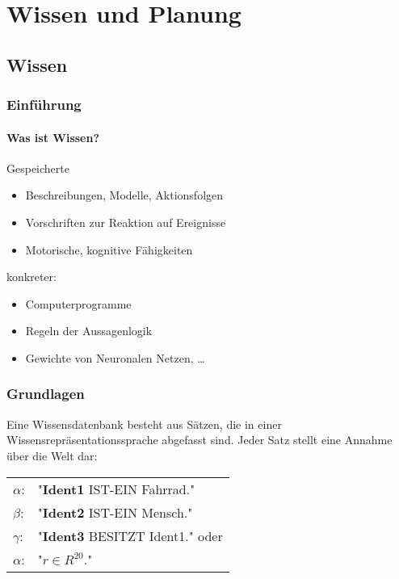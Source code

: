 
\chapter{Wissen und Planung}
\section{Wissen}
\subsection{Einführung}

\subsubsection*{Was ist Wissen?}
Gespeicherte
\begin{itemize}
\item Beschreibungen, Modelle, Aktionsfolgen
\item Vorschriften zur Reaktion auf Ereignisse
\item Motorische, kognitive Fähigkeiten
\end{itemize}
konkreter:
\begin{itemize}
\item Computerprogramme
\item Regeln der Aussagenlogik
\item Gewichte von Neuronalen Netzen, \dots
\end{itemize}

\subsection{Grundlagen}


Eine Wissensdatenbank besteht aus Sätzen, die in einer Wissensrepräsentationssprache abgefasst sind. Jeder Satz stellt eine Annahme über die Welt dar:
\begin{center}
\begin{tabular}{ll}
$\alpha$: & "{}\textbf{Ident1} IST-EIN Fahrrad."{} \\ $\beta$: & "{}\textbf{Ident2} IST-EIN Mensch."{} \\ $\gamma$: & "{}\textbf{Ident3} BESITZT Ident1."{} oder \\ $\alpha$: & "{}$r \in R^{20}$."{}
\end{tabular}
\end{center}

